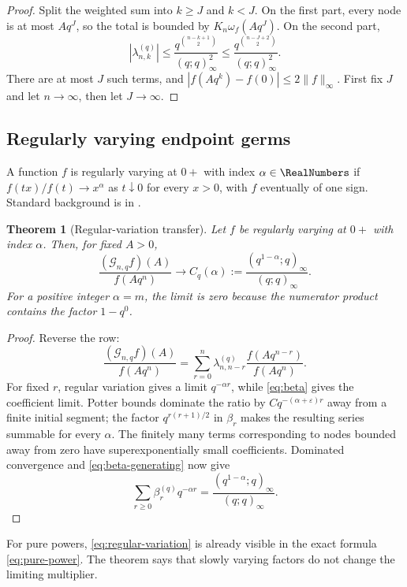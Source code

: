 \documentclass[11pt,oneside]{article}
\numberwithin{equation}{section}
\newtheorem{theorem}{Theorem}[section]
\theoremstyle{definition}
\theoremstyle{remark}
\newcommand{\Gc}{\mathcal G}
\begin{document}
\begin{proof}
Split the weighted sum into $k\ge J$ and $k<J$.  On the first part, every node
is at most $Aq^J$, so the total is bounded by $K_n\omega_f(Aq^J)$.  On the
second part,
\[
 |\lambda_{n,k}^{(q)}|
 \le\frac{q^{\binom{n-k+1}{2}}}{(q;q)_\infty^2}
 \le\frac{q^{\binom{n-J+2}{2}}}{(q;q)_\infty^2}.
\]
There are at most $J$ such terms, and
$|f(Aq^k)-f(0)|\le2\|f\|_\infty$.  First fix $J$ and let $n\to\infty$, then let
$J\to\infty$.
\end{proof}

\subsection{Regularly varying endpoint germs}

A function $f$ is regularly varying at $0+$ with index $\alpha\in\RealNumbers$ if
$f(tx)/f(t)\to x^\alpha$ as $t\downarrow0$ for every $x>0$, with $f$ eventually
of one sign.  Standard background is in \cite{BinghamGoldieTeugels}.

\begin{theorem}[Regular-variation transfer]
Let $f$ be regularly varying at $0+$ with index $\alpha$.  Then, for fixed
$A>0$,
\begin{equation}
 \frac{(\Gc_{n,q}f)(A)}{f(Aq^n)}
 \longrightarrow C_q(\alpha):=
 \frac{(q^{1-\alpha};q)_\infty}{(q;q)_\infty}.
 \label{eq:regular-variation}
\end{equation}
For a positive integer $\alpha=m$, the limit is zero because the numerator
product contains the factor $1-q^0$.
\end{theorem}

\begin{proof}
Reverse the row:
\[
 \frac{(\Gc_{n,q}f)(A)}{f(Aq^n)}
 =\sum_{r=0}^n\lambda_{n,n-r}^{(q)}
   \frac{f(Aq^{n-r})}{f(Aq^n)}.
\]
For fixed $r$, regular variation gives a limit $q^{-\alpha r}$, while
\eqref{eq:beta} gives the coefficient limit.  Potter bounds dominate the
ratio by $Cq^{-(\alpha+\varepsilon)r}$ away from a finite initial segment; the
factor $q^{r(r+1)/2}$ in $\beta_r$ makes the resulting series summable for every
$\alpha$.  The finitely many terms corresponding to nodes bounded away from
zero have superexponentially small coefficients.  Dominated convergence and
\eqref{eq:beta-generating} now give
\[
 \sum_{r\ge0}\beta_r^{(q)}q^{-\alpha r}
 =\frac{(q^{1-\alpha};q)_\infty}{(q;q)_\infty}.
\]
\end{proof}

For pure powers, \eqref{eq:regular-variation} is already visible in the exact
formula \eqref{eq:pure-power}.  The theorem says that slowly varying factors do
not change the limiting multiplier.
\end{document}
